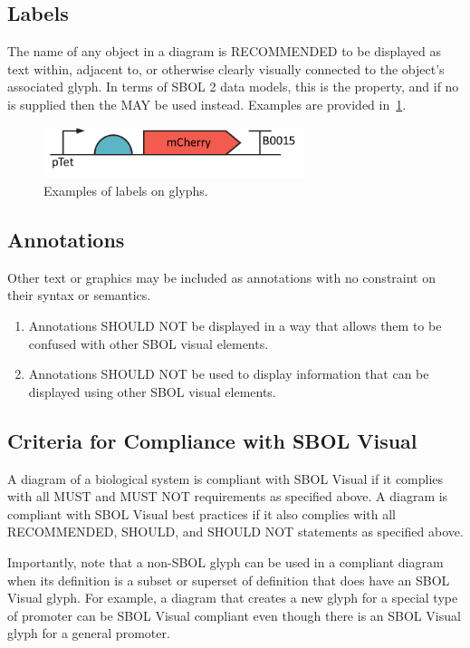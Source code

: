 	
\subsection{Labels}
The name of any object in a diagram is RECOMMENDED to be displayed as text within, adjacent to, or otherwise clearly visually connected to the object's associated glyph.  In terms of SBOL 2 data models, this is the  property, and if no  is supplied then the  MAY be used instead.
Examples are provided in~\ref{exa:5}.

	\begin{figure}[h!]
	\centering
	\includegraphics[width=3in]{figures/examples/5-labels.pdf}
	\caption{Examples of labels on glyphs.}
	\label{exa:5}
	\end{figure}


\subsection{Annotations}
Other text or graphics may be included as annotations with no constraint on their syntax or semantics.

\begin{enumerate}
\item Annotations SHOULD NOT be displayed in a way that allows them to be confused with other SBOL visual elements.
\item Annotations SHOULD NOT be used to display information that can be displayed using other SBOL visual elements.
\end{enumerate}

\subsection{Criteria for Compliance with SBOL Visual}

A diagram of a biological system is compliant with SBOL Visual if it complies with all MUST and MUST NOT requirements as specified above.
A diagram is compliant with SBOL Visual best practices if it also complies with all RECOMMENDED, SHOULD, and SHOULD NOT statements as specified above.

Importantly, note that a non-SBOL glyph can be used in a compliant
diagram when its definition is a subset or superset of definition that
does have an SBOL Visual glyph.  For example, a diagram that creates a
new glyph for a special type of promoter can be SBOL Visual compliant
even though there is an SBOL Visual glyph for a general promoter.

